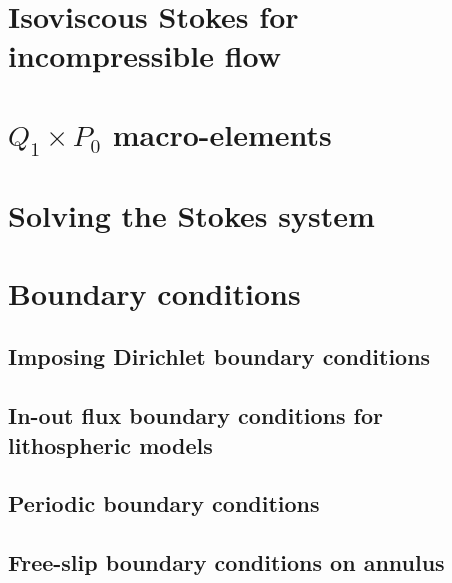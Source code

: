 \newpage %
\section{Isoviscous Stokes for incompressible flow}\label{ss:isovisc}  %

\newpage %
\section{$Q_1\times P_0$ macro-elements} \label{ss:meshtopos}  %

\newpage %
\section{Solving the Stokes system \label{sec:solvers}}  %

\newpage %
\section{Boundary conditions}
\subsection{Imposing Dirichlet boundary conditions \label{ss:howtobc}}  %
\newpage %
\subsection{In-out flux boundary conditions for lithospheric models}\label{kin_bc}  
\newpage %
\subsection{Periodic boundary conditions\label{ss_periodic}} %
\newpage %
\subsection{Free-slip boundary conditions on annulus}\label{ss:fsbc_annulus} %

